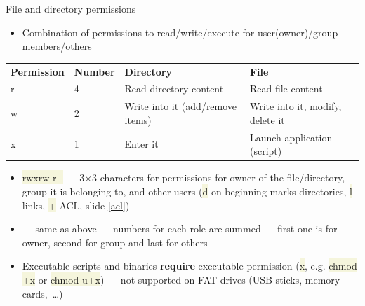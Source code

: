 \documentclass[compress, xelatex, 11pt, xcolor=svgnames, aspectratio=169,
	hyperref={
		bookmarks=true,
		unicode=true,
		colorlinks=true,
		pdftitle={Linux, command line and MetaCentrum},
		plainpages=false,
		pdfauthor={Vojtech Zeisek},
		pdfsubject={Course about use of Linux command line, writing shell scripts and using MetaCentrum of CESNET},
		pdfcreator={XeLaTeX},
		pdfkeywords={Linux, GNU, BASH, shell, command line, MetaCentrum},
		linkcolor=DarkRed, %
		anchorcolor=DarkBlue, %
		citecolor=Indigo, %
		filecolor=NavyBlue, %
		menucolor=DarkMagenta, %
		urlcolor=DarkBlue, %
		},
	url={hyphens, lowtilde} %
	]{beamer}
\renewcommand{\texttt}[1]{\colorbox{Beige}{{\ttfamily #1}}}
\begin{document}
\begin{frame}{File and directory permissions}
	\label{permissions}
	\begin{itemize}
		\item Combination of permissions to read/write/execute for user(owner)/group members/others
	\end{itemize}
	\begin{center}
		\begin{tabular}{llll}
			\textbf{Permission} & \textbf{Number} & \textbf{Directory} & \textbf{File}\\
			r & 4 & Read directory content & Read file content\\
			w & 2 & Write into it (add/remove items) & Write into it, modify, delete it\\
			x & 1 & Enter it & Launch application (script)
		\end{tabular}
	\end{center}
	\begin{itemize}
		\item \texttt{rwxrw-r-{-}} --- 3$\times$3 characters for permissions for owner of the file/directory, group it is belonging to, and other users (\texttt{d} on beginning marks directories, \texttt{l} links, \texttt{+} ACL, slide \ref{acl})
		\item \texttt{764} --- same as above --- numbers for each role are summed --- first one is for owner, second for group and last for others
		\item Executable scripts and binaries \textbf{require} executable permission (\texttt{x}, e.g. \texttt{chmod +x} or \texttt{chmod u+x}) --- not supported on FAT drives (USB sticks, memory cards,~\ldots)
	\end{itemize}
\end{frame}
\end{document}
